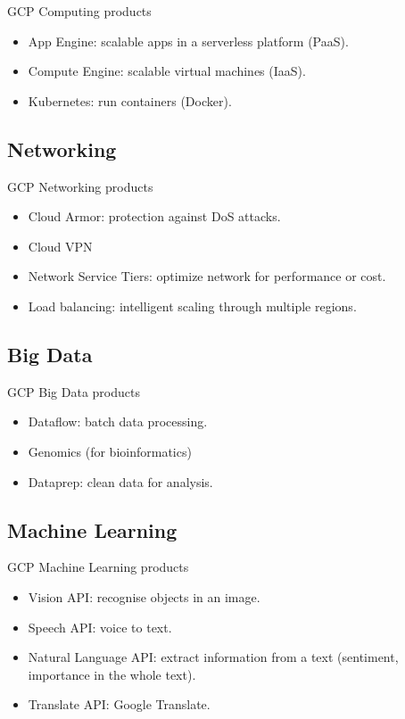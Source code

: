 \documentclass{beamer}
\begin{document}
\begin{frame}[fragile]{GCP Computing products}
  \begin{itemize}[<+->]
    \item App Engine: scalable apps in a serverless platform (PaaS).
    \item Compute Engine: scalable virtual machines (IaaS).
    \item Kubernetes: run containers (Docker).
  \end{itemize}
\end{frame}

\subsection{Networking}

\begin{frame}[fragile]{GCP Networking products}
  \begin{itemize}[<+->]
    \item Cloud Armor: protection against DoS attacks.
    \item Cloud VPN
    \item Network Service Tiers: optimize network for performance or cost.
    \item Load balancing: intelligent scaling through multiple regions.
  \end{itemize}
\end{frame}

\subsection{Big Data}

\begin{frame}[fragile]{GCP Big Data products}
  \begin{itemize}[<+->]
    \item Dataflow: batch data processing.
    \item Genomics (for bioinformatics)
    \item Dataprep: clean data for analysis.
  \end{itemize}
\end{frame}

\subsection{Machine Learning}

\begin{frame}[fragile]{GCP Machine Learning products}
  \begin{itemize}[<+->]
    \item Vision API: recognise objects in an image.
    \item Speech API: voice to text.
    \item Natural Language API: extract information from a text (sentiment, importance in the whole text).
    \item Translate API: Google Translate.
  \end{itemize}
\end{frame}
\end{document}
